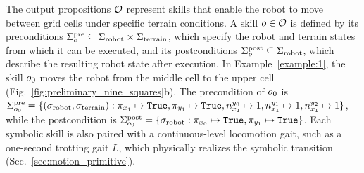 
The output propositions
${\mathcal O}$
represent skills that enable the robot to move between grid cells under specific terrain conditions.
A skill $o \in {\mathcal O}$ is defined by its preconditions
$\Sigma_{o}^{\textrm{pre}} \subseteq \Sigma_{\textrm{robot}} \times \Sigma_{\textrm{terrain}}$,
which specify the robot and terrain states from which it can be executed,
and its postconditions
$\Sigma_{o}^{\textrm{post}} \subseteq \Sigma_{\textrm{robot}}$,
which describe the resulting robot state after execution.
In Example~\ref{example:1}, the skill $o_{0}$ moves the robot from the middle cell to the upper cell (Fig.~\ref{fig:preliminary_nine_squares}b).
The precondition of $o_{0}$ is
$\Sigma_{o_{0}}^{\textrm{pre}} = \{ (\sigma_{\textrm{robot}}, \sigma_{\textrm{terrain}}): \pi_{x_1}\mapsto {\tt{True}}, \pi_{y_1}\mapsto {\tt{True}}, n_{x_1}^{y_0}\mapsto 1, n_{x_1}^{y_1}\mapsto 1, n_{x_1}^{y_2}\mapsto 1 \}$,
while the postcondition is
$\Sigma_{o_{0}}^{\textrm{post}} = \{ \sigma_{\textrm{robot}}: \pi_{x_0}\mapsto {\tt{True}}, \pi_{y_1}\mapsto {\tt{True}} \}$.
Each symbolic skill is also paired with a continuous-level locomotion gait, such as a one-second trotting gait $L$, which physically realizes the symbolic transition (Sec.~\ref{sec:motion_primitive}).


